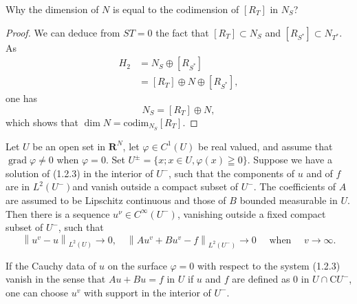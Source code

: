 \documentclass[lang=cn,zihao=-4,a4paper,fontset=none]{beautybook}
\begin{document}
\begin{problem}
Why the dimension of $N$ is equal to the codimension of $[R_T]$ in $N_S$?
\end{problem}
\newpage
\begin{proof}
  We can deduce from $ST=0$ the fact that $[R_T]\subset N_S$ and $[R_{S^*}]\subset N_{T^*}$. As 
   \begin{align*}
        H_2 &=N_S\oplus [R_{S^*}]\\
                &=[R_T]\oplus N\oplus [R_{S^*}],
   \end{align*}
      one has 
      \[
      N_S=[R_T]\oplus N,
      \]
      which shows that $\dim N=\textrm{codim}_{N_S} [R_T]$.
\end{proof}

\begin{proposition}
Let $U$ be an open set in $\mathbf{R}^N$, let $\varphi \in C^1(U)$ be real valued, and assume that $\operatorname{grad} \varphi \neq 0$ when $\varphi=0$. Set $U ^\pm=\{x ; x \in U, \varphi(x) \geqq 0\}$. Suppose we have a solution of (1.2.3) in the interior of $U^{-}$, such that the components of $u$ and of $f$ are in $L^2\left(U^{-}\right)$and vanish outside a compact subset of $U^{-}$. The coefficients of $A$ are assumed to be Lipschitz continuous and those of $B$ bounded measurable in $U$. Then there is a sequence $u^\nu \in C^{\infty}\left(U^{-}\right)$, vanishing outside a fixed compact subset of $U^{-}$, such that
$$
\left\|u^v-u\right\|_{L^2(U)} \rightarrow 0, \quad\left\|A u^v+B u^v-f\right\|_{L^2\left(U^{-}\right)} \rightarrow 0 \quad \text { when } \quad v \rightarrow \infty .
$$

If the Cauchy data of $u$ on the surface $\varphi=0$ with respect to the system (1.2.3) vanish in the sense that $A u+B u=f$ in $U$ if $u$ and $f$ are defined as 0 in $U \cap \mathrm{C} U^{-}$, one can choose $u^v$ with support in the interior of $U^{-}$.
\end{proposition}
\end{document}
